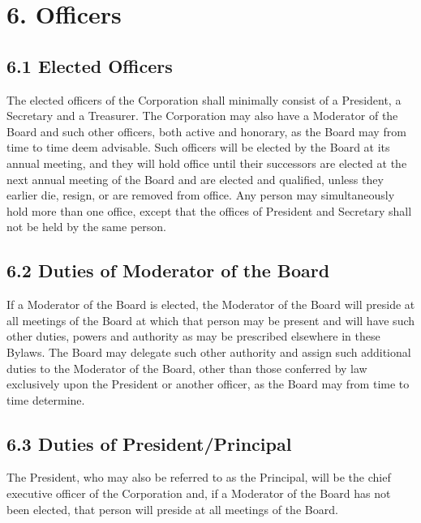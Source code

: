 \documentclass[
]{book}
\begin{document}
\section*{6. Officers}\label{officers}

\subsection*{6.1 Elected Officers}\label{elected-officers}

The elected officers of the Corporation shall minimally consist of a President, a Secretary and a Treasurer. The Corporation may also have a Moderator of the Board and such other officers, both active and honorary, as the Board may from time to time deem advisable. Such officers will be elected by the Board at its annual meeting, and they will hold office until their successors are elected at the next annual meeting of the Board and are elected and qualified, unless they earlier die, resign, or are removed from office. Any person may simultaneously hold more than one office, except that the offices of President and Secretary shall not be held by the same person.

\subsection*{6.2 Duties of Moderator of the Board}\label{duties-of-moderator-of-the-board}

If a Moderator of the Board is elected, the Moderator of the Board will preside at all meetings of the Board at which that person may be present and will have such other duties, powers and authority as may be prescribed elsewhere in these Bylaws. The Board may delegate such other authority and assign such additional duties to the Moderator of the Board, other than those conferred by law exclusively upon the President or another officer, as the Board may from time to time determine.

\subsection*{6.3 Duties of President/Principal}\label{duties-of-presidentprincipal}

The President, who may also be referred to as the Principal, will be the chief executive officer of the Corporation and, if a Moderator of the Board has not been elected, that person will preside at all meetings of the Board.
\end{document}
